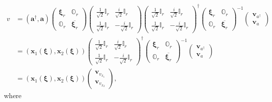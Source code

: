 \documentclass[aps, preprint]{revtex4}
\begin{document}
\begin{align}v &  =\left (\mathbf{a}^{ \dag } ,\mathbf{a}\right )\left (\begin{array}{cc}\mathbf{\xi }_{r} & \mathbb{O}_{r} \\
\mathbb{O}_{r} & \overline{\mathbf{\xi }_{r}}\end{array}\right ) \left (\begin{array}{cc}\frac{1}{\sqrt{2}} \mathbb{I}_{r} & \frac{i}{\sqrt{2}} \mathbb{I}_{r} \\
\frac{1}{\sqrt{2}} \mathbb{I}_{r} &  -\frac{i}{\sqrt{2}} \mathbb{I}_{r}\end{array}\right ) \left (\begin{array}{cc}\frac{1}{\sqrt{2}} \mathbb{I}_{r} & \frac{i}{\sqrt{2}} \mathbb{I}_{r} \\
\frac{1}{\sqrt{2}} \mathbb{I}_{r} &  -\frac{i}{\sqrt{2}} \mathbb{I}_{r}\end{array}\right )^{ \dag } \left (\begin{array}{cc}\mathbf{\xi }_{r} & \mathbb{O}_{r} \\
\mathbb{O}_{r} & \overline{\mathbf{\xi }_{r}}\end{array}\right )^{ -1} \left (\begin{array}{c}\mathbf{v}_{a^{ \dag }} \\
\mathbf{v}_{a}\end{array}\right ) \\
 &  =\left (\mathbf{x}_{1} \left (\mathbf{\xi }\right ) ,\mathbf{x}_{2} \left (\mathbf{\xi }\right )\right )\left (\begin{array}{cc}\frac{1}{\sqrt{2}} \mathbb{I}_{r} & \frac{i}{\sqrt{2}} \mathbb{I}_{r} \\
\frac{1}{\sqrt{2}} \mathbb{I}_{r} &  -\frac{i}{\sqrt{2}} \mathbb{I}_{r}\end{array}\right )^{ \dag } \left (\begin{array}{cc}\mathbf{\xi }_{r} & \mathbb{O}_{r} \\
\mathbb{O}_{r} & \overline{\mathbf{\xi }_{r}}\end{array}\right )^{ -1} \left (\begin{array}{c}\mathbf{v}_{a^{ \dag }} \\
\mathbf{v}_{a}\end{array}\right ) \\
 &  =\left (\mathbf{x}_{1} \left (\mathbf{\xi }\right ) ,\mathbf{x}_{2} \left (\mathbf{\xi }\right )\right )\left (\begin{array}{c}\mathbf{v}_{v_{x_{1}}} \\
\mathbf{v}_{v_{x_{2}}}\end{array}\right )\text{,}\end{align}where
\end{document}
